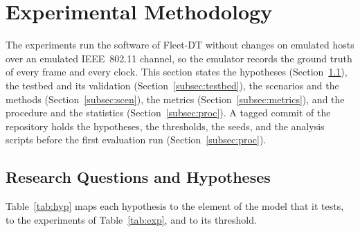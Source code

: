 \section{Experimental Methodology}\label{sec:method}

The experiments run the software of Fleet-DT without changes on emulated hosts over an emulated IEEE~802.11 channel, so the emulator records the ground truth of every frame and every clock. This section states the hypotheses (Section~\ref{subsec:hyp}), the testbed and its validation (Section~\ref{subsec:testbed}), the scenarios and the methods (Section~\ref{subsec:scen}), the metrics (Section~\ref{subsec:metrics}), and the procedure and the statistics (Section~\ref{subsec:proc}). A tagged commit of the repository holds the hypotheses, the thresholds, the seeds, and the analysis scripts before the first evaluation run (Section~\ref{subsec:proc}).

\subsection{Research Questions and Hypotheses}\label{subsec:hyp}

Table~\ref{tab:hyp} maps each hypothesis to the element of the model that it tests, to the experiments of Table~\ref{tab:exp}, and to its threshold.

